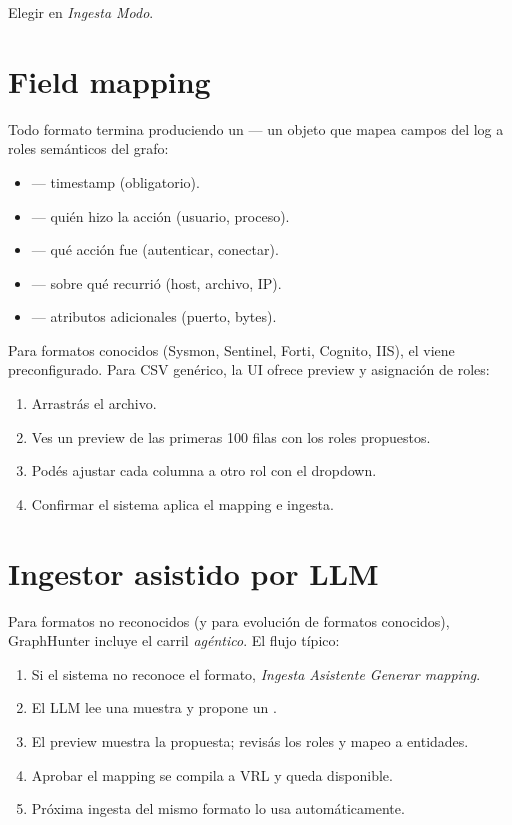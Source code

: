 Elegir en \emph{Ingesta \textrightarrow{} Modo}.

\section{Field mapping}

Todo formato termina produciendo un  — un objeto
que mapea campos del log a roles semánticos del grafo:

\begin{itemize}
    \item {} — timestamp (obligatorio).
    \item {} — quién hizo la acción (usuario, proceso).
    \item {} — qué acción fue (autenticar, conectar).
    \item {} — sobre qué recurrió (host, archivo, IP).
    \item {} — atributos adicionales (puerto, bytes).
\end{itemize}

Para formatos conocidos (Sysmon, Sentinel, Forti, Cognito, IIS),
el  viene preconfigurado. Para CSV genérico, la
UI ofrece preview y asignación de roles:

\begin{enumerate}
    \item Arrastrás el archivo.
    \item Ves un preview de las primeras 100 filas con los roles
    propuestos.
    \item Podés ajustar cada columna a otro rol con el dropdown.
    \item Confirmar \textrightarrow{} el sistema aplica el mapping
    e ingesta.
\end{enumerate}

\section{Ingestor asistido por LLM}

Para formatos no reconocidos (y para evolución de formatos
conocidos), GraphHunter incluye el carril \emph{agéntico}. El
flujo típico:

\begin{enumerate}
    \item Si el sistema no reconoce el formato,
    \emph{Ingesta \textrightarrow{} Asistente \textrightarrow{}
    Generar mapping}.
    \item El LLM lee una muestra y propone un
    .
    \item El preview muestra la propuesta; revisás los roles y
    mapeo a entidades.
    \item Aprobar \textrightarrow{} el mapping se compila a VRL y
    queda disponible.
    \item Próxima ingesta del mismo formato lo usa
    automáticamente.
\end{enumerate}

